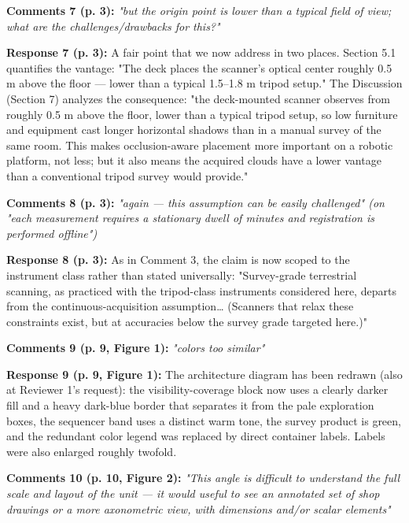\documentclass[11pt]{article}
\begin{document}
\medskip

\textbf{Comments 7 (p. 3):} \emph{"but the origin point is lower than a typical field of view; what are the challenges/drawbacks for this?"}

\textbf{Response 7 (p. 3):} A fair point that we now address in two places. Section 5.1 quantifies the vantage: "The deck places the scanner's optical center roughly 0.5 m above the floor — lower than a typical 1.5–1.8 m tripod setup." The Discussion (Section 7) analyzes the consequence: "the deck-mounted scanner observes from roughly 0.5 m above the floor, lower than a typical tripod setup, so low furniture and equipment cast longer horizontal shadows than in a manual survey of the same room. This makes occlusion-aware placement more important on a robotic platform, not less; but it also means the acquired clouds have a lower vantage than a conventional tripod survey would provide."

\medskip

\textbf{Comments 8 (p. 3):} \emph{"again — this assumption can be easily challenged" \emph{(on "each measurement requires a stationary dwell of minutes and registration is performed offline")}}

\textbf{Response 8 (p. 3):} As in Comment 3, the claim is now scoped to the instrument class rather than stated universally: "Survey-grade terrestrial scanning, as practiced with the tripod-class instruments considered here, departs from the continuous-acquisition assumption… (Scanners that relax these constraints exist, but at accuracies below the survey grade targeted here.)"

\medskip

\textbf{Comments 9 (p. 9, Figure 1):} \emph{"colors too similar"}

\textbf{Response 9 (p. 9, Figure 1):} The architecture diagram has been redrawn (also at Reviewer 1's request): the visibility-coverage block now uses a clearly darker fill and a heavy dark-blue border that separates it from the pale exploration boxes, the sequencer band uses a distinct warm tone, the survey product is green, and the redundant color legend was replaced by direct container labels. Labels were also enlarged roughly twofold.

\medskip

\textbf{Comments 10 (p. 10, Figure 2):} \emph{"This angle is difficult to understand the full scale and layout of the unit — it would useful to see an annotated set of shop drawings or a more axonometric view, with dimensions and/or scalar elements"}
\end{document}
